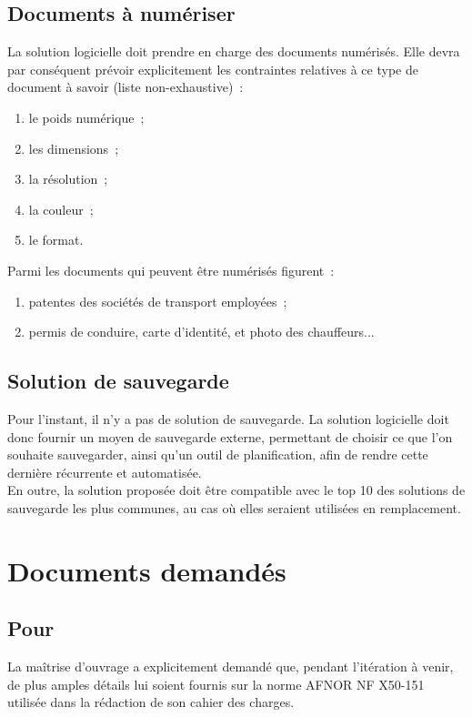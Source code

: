 \documentclass[11pt,fleqn]{report}
\begin{document}
\subsection{Documents à numériser}
La solution logicielle doit prendre en charge des documents numérisés. Elle devra par conséquent prévoir explicitement les contraintes relatives à ce type de document à savoir (liste non-exhaustive)~:
\begin{enumerate}
	\item le poids numérique~;
	\item les dimensions~;
	\item la résolution~;
	\item la couleur~;
	\item le format.
\end{enumerate}
Parmi les documents qui peuvent être numérisés figurent~:
\begin{enumerate}
	\item patentes des sociétés de transport employées~;
	\item permis de conduire, carte d'identité, et photo des chauffeurs...
\end{enumerate}

\subsection{Solution de sauvegarde}
Pour l'instant, il n'y a pas de solution de sauvegarde. La solution logicielle doit donc  fournir un moyen de sauvegarde externe, permettant de choisir ce que l'on souhaite sauvegarder, ainsi qu'un outil de planification, afin de rendre cette dernière récurrente et automatisée.
\\
En outre, la solution proposée doit être compatible avec le top 10 des solutions de sauvegarde les plus communes, au cas où elles seraient utilisées en remplacement.

\section{Documents demandés}

\subsection{Pour \mo}
La maîtrise d'ouvrage a explicitement demandé que, pendant l'itération à venir, de plus amples détails lui soient fournis sur la norme AFNOR NF X50-151 utilisée dans la rédaction de son cahier des charges.
\end{document}
